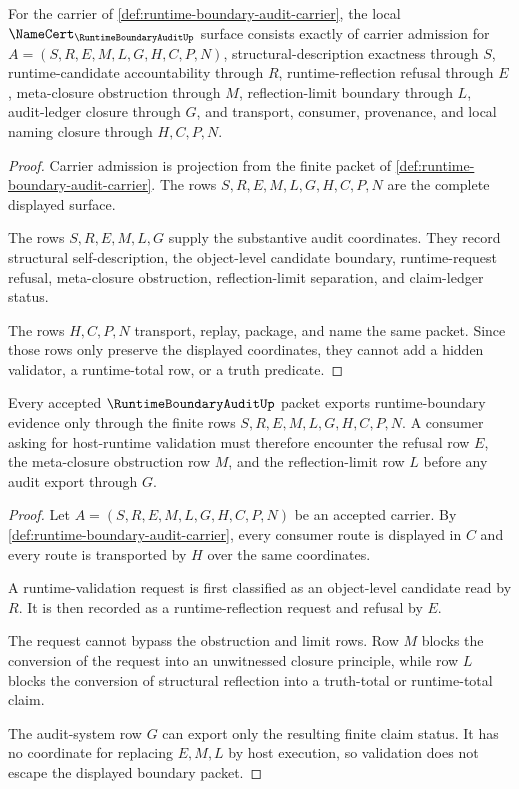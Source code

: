 \begin{theorem}
\label{thm:runtime-boundary-audit-namecert-obligations}
For the carrier of \autoref{def:runtime-boundary-audit-carrier}, the local $\NameCert_{\RuntimeBoundaryAuditUp}$ surface consists exactly of carrier admission for $A=(S,R,E,M,L,G,H,C,P,N)$, structural-description exactness through $S$, runtime-candidate accountability through $R$, runtime-reflection refusal through $E$, meta-closure obstruction through $M$, reflection-limit boundary through $L$, audit-ledger closure through $G$, and transport, consumer, provenance, and local naming closure through $H,C,P,N$.
\end{theorem}
\begin{proof}
Carrier admission is projection from the finite packet of \autoref{def:runtime-boundary-audit-carrier}. The rows $S,R,E,M,L,G,H,C,P,N$ are the complete displayed surface.

The rows $S,R,E,M,L,G$ supply the substantive audit coordinates. They record structural self-description, the object-level candidate boundary, runtime-request refusal, meta-closure obstruction, reflection-limit separation, and claim-ledger status.

The rows $H,C,P,N$ transport, replay, package, and name the same packet. Since those rows only preserve the displayed coordinates, they cannot add a hidden validator, a runtime-total row, or a truth predicate.
\end{proof}

\begin{theorem}
\label{thm:runtime-boundary-audit-validation-nonescape}
Every accepted $\RuntimeBoundaryAuditUp$ packet exports runtime-boundary evidence only through the finite rows $S,R,E,M,L,G,H,C,P,N$. A consumer asking for host-runtime validation must therefore encounter the refusal row $E$, the meta-closure obstruction row $M$, and the reflection-limit row $L$ before any audit export through $G$.
\end{theorem}
\begin{proof}
Let $A=(S,R,E,M,L,G,H,C,P,N)$ be an accepted carrier. By \autoref{def:runtime-boundary-audit-carrier}, every consumer route is displayed in $C$ and every route is transported by $H$ over the same coordinates.

A runtime-validation request is first classified as an object-level candidate read by $R$. It is then recorded as a runtime-reflection request and refusal by $E$.

The request cannot bypass the obstruction and limit rows. Row $M$ blocks the conversion of the request into an unwitnessed closure principle, while row $L$ blocks the conversion of structural reflection into a truth-total or runtime-total claim.

The audit-system row $G$ can export only the resulting finite claim status. It has no coordinate for replacing $E,M,L$ by host execution, so validation does not escape the displayed boundary packet.
\end{proof}

